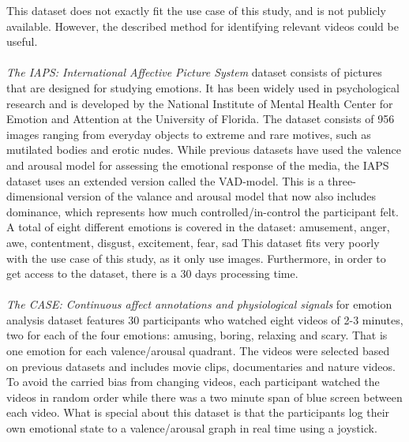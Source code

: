This dataset does not exactly fit the use case of this study, and is not publicly available. However, the described method for identifying relevant videos could be useful.  \\\\
\textit{The IAPS: International Affective Picture System} dataset consists of pictures that are designed for studying emotions. It has been widely used in psychological research and is developed by the National Institute of Mental Health Center for Emotion and Attention at the University of Florida. The dataset consists of 956 images ranging from everyday objects to extreme and rare motives, such as mutilated bodies and erotic nudes. While previous datasets have used the valence and arousal model for assessing the emotional response of the media, the IAPS dataset uses an extended version called the VAD-model. This is a three-dimensional version of the valance and arousal model that now also includes dominance, which represents how much controlled/in-control the participant felt.\cite{IAPS}
A total of eight different emotions is covered in the dataset: amusement, anger, awe, contentment, disgust, excitement, fear, sad
This dataset fits very poorly with the use case of this study, as it only use images. Furthermore, in order to get access to the dataset, there is a 30 days processing time. \\\\
\textit{The CASE: Continuous affect annotations and physiological signals} for emotion analysis dataset features 30 participants who watched eight videos of 2-3 minutes, two for each of the four emotions: amusing, boring, relaxing and scary. That is one emotion for each valence/arousal quadrant. The videos were selected based on previous datasets and includes movie clips, documentaries and nature videos. To avoid the carried bias from changing videos, each participant watched the videos in random order while there was a two minute span of blue screen between each video. What is special about this dataset is that the participants log their own emotional state to a valence/arousal graph in real time using a joystick. \cite{CaseData}
